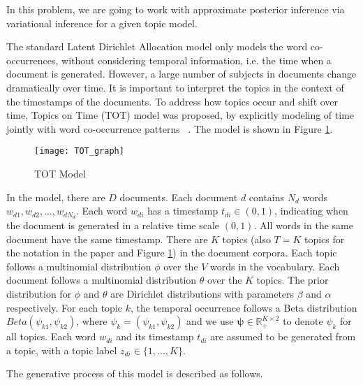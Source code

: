 \documentclass{article}
\newcommand{\psiv       }{\boldsymbol \psi       }
\begin{document}
In this problem, we are going to work with approximate posterior inference via variational inference for a given topic model. 

The standard Latent Dirichlet Allocation model only models the word co-occurrences, without considering temporal information, i.e. the time when a document is generated. However, a large number of subjects in documents change dramatically over time. It is important to interpret the topics in the context of the timestamps of the documents. To address how topics occur and shift over time, Topics on Time (TOT) model was proposed, by explicitly modeling of time jointly with word co-occurrence patterns ~\citep{wang2006topics}. The model is shown in Figure \ref{fig:tot_model}.

\begin{figure}[!ht]
	\centering
	\texttt{[image: TOT\_graph]}
	\caption{TOT Model}
	\label{fig:tot_model}
\end{figure}

In the model, there are $D$ documents. Each document $d$ contains $N_d$ words $w_{d1}, w_{d2}, ..., w_{dN_d}$. Each word $w_{di}$ has a timestamp $t_{di}\in(0, 1)$, indicating when the document is generated in a relative time scale $(0, 1)$. All words in the same document have the same timestamp. There are $K$ topics (also $T=K$ topics for the notation in the paper and Figure \ref{fig:tot_model}) in the document corpora. Each topic follows a multinomial distribution $\phi$ over the $V$ words in the vocabulary. Each document follows a multinomial distribution $\theta$ over the $K$ topics. The prior distribution for $\phi$ and $\theta$ are Dirichlet distributions with parameters $\beta$ and $\alpha$ respectively. For each topic $k$, the temporal occurrence follows a Beta distribution $Beta(\psi_{k1}, \psi_{k2})$, where $\psi_{k} = (\psi_{k1}, \psi_{k2})$ and we use $\psiv \in \mathbb{R}_{+}^{K\times 2}$ to denote $\psi_k$ for all topics. Each word $w_{di}$ and its timestamp $t_{di}$ are assumed to be generated from a topic, with a topic label $z_{di}\in\{1, ..., K\}$. 

The generative process of this model is described as follows. \\
\end{document}
